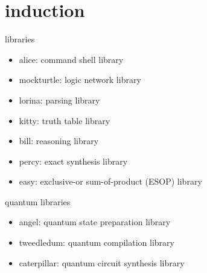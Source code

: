 \section{induction}

\begin{frame}{libraries}
  \begin{itemize}
    \item alice:  command shell library
    \item mockturtle:  logic network library
    \item lorina:  parsing library
    \item kitty:  truth table library
    \item bill:  reasoning library
    \item percy:  exact synthesis library
    \item easy:  exclusive-or sum-of-product (ESOP) library
  \end{itemize}
\end{frame}
\begin{frame}{quantum libraries}
  \begin{itemize}
    \item angel: quantum state preparation library
    \item tweedledum: quantum compilation library
    \item caterpillar: quantum circuit synthesis library
  \end{itemize}
\end{frame}